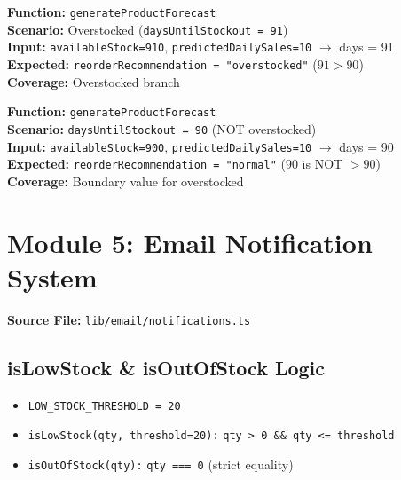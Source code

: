 \documentclass[12pt,a4paper]{report}
\newcommand{\ptwo}{\textbf{\color{p2orange}P2}}
\begin{document}
\begin{tcolorbox}[testbox, title={FORE-022 \hfill \ptwo}]
\textbf{Function:} \texttt{generateProductForecast} \\
\textbf{Scenario:} Overstocked (\texttt{daysUntilStockout = 91}) \\
\textbf{Input:} \texttt{availableStock=910}, \texttt{predictedDailySales=10} $\to$ days = 91 \\
\textbf{Expected:} \texttt{reorderRecommendation = "overstocked"} ($91 > 90$) \\
\textbf{Coverage:} Overstocked branch
\end{tcolorbox}

\begin{tcolorbox}[testbox, title={FORE-023 \hfill \ptwo\ --- Boundary}]
\textbf{Function:} \texttt{generateProductForecast} \\
\textbf{Scenario:} \texttt{daysUntilStockout = 90} (NOT overstocked) \\
\textbf{Input:} \texttt{availableStock=900}, \texttt{predictedDailySales=10} $\to$ days = 90 \\
\textbf{Expected:} \texttt{reorderRecommendation = "normal"} ($90$ is NOT $> 90$) \\
\textbf{Coverage:} Boundary value for overstocked
\end{tcolorbox}


\chapter{Module 5: Email Notification System}

\textbf{Source File:} \texttt{lib/email/notifications.ts}

\section{isLowStock \& isOutOfStock Logic}

\begin{tcolorbox}[infobox, title={Stock Alert Thresholds}]
\begin{itemize}
  \item \texttt{LOW\_STOCK\_THRESHOLD = 20}
  \item \texttt{isLowStock(qty, threshold=20):} \texttt{qty > 0 \&\& qty <= threshold}
  \item \texttt{isOutOfStock(qty):} \texttt{qty === 0} (strict equality)
\end{itemize}
\end{tcolorbox}
\end{document}
